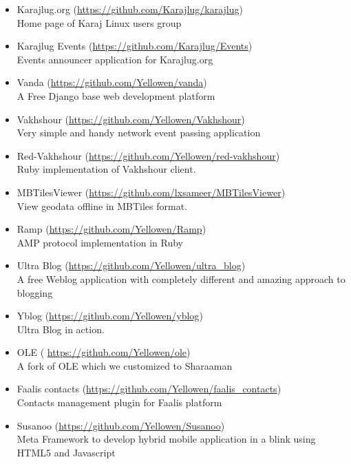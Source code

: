 \documentclass[a4paper,11pt]{article}
\begin{document}
\begin{itemize}
\item Karajlug.org (\url{https://github.com/Karajlug/karajlug})\\
  Home page of Karaj Linux users group

\item Karajlug Events (\url{https://github.com/Karajlug/Events})\\
  Events announcer application for Karajlug.org

\item Vanda (\url{https://github.com/Yellowen/vanda})\\
  A Free Django base web development platform

\item Vakhshour (\url{https://github.com/Yellowen/Vakhshour})\\
  Very simple and handy network event passing application

\item Red-Vakhshour (\url{https://github.com/Yellowen/red-vakhshour})\\
  Ruby implementation of Vakhshour client.

\item MBTilesViewer (\url{https://github.com/lxsameer/MBTilesViewer})\\
  View geodata offline in MBTiles format.

\item Ramp (\url{https://github.com/Yellowen/Ramp})\\
  AMP protocol implementation in Ruby

\item Ultra Blog (\url{https://github.com/Yellowen/ultra_blog})\\
  A free Weblog application with completely different and amazing approach to
  blogging

\item Yblog (\url{https://github.com/Yellowen/yblog})\\
  Ultra Blog in action.

\item OLE ( \url{https://github.com/Yellowen/ole})\\
  A fork of OLE which we customized to Sharaaman

\item Faalis contacts (\url{https://github.com/Yellowen/faalis_contacts})\\
  Contacts management plugin for Faalis platform

\item Susanoo (\url{https://github.com/Yellowen/Susanoo})\\
  Meta Framework to develop hybrid mobile application in a blink using
  HTML5 and Javascript


\end{itemize}
\end{document}
